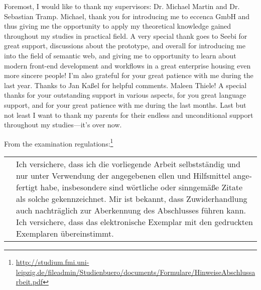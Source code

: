 Foremost, I would like to thank my supervisors: Dr. Michael Martin and Dr. Sebastian Tramp. Michael, thank you for introducing me to eccenca GmbH and thus giving me the opportunity to apply my theoretical knowledge gained throughout my studies in practical field. A very special thank goes to Seebi for great support, discussions about the prototype, and overall for introducing me into the field of semantic web, and giving me to opportunity to learn about modern front-end development and workflows in a great enterprise housing even more sincere people! I’m also grateful for your great patience with me during the last year. Thanks to Jan Kaßel for helpful comments. Maleen Thiele! A special thanks for your outstanding support in various aspects, for you great language support, and for your great patience with me during the last months. Last but not least I want to thank my parents for their endless and unconditional support throughout my studies—it’s over now.



From the examination regulations:\footnote{\url{http://studium.fmi.uni-leipzig.de/fileadmin/Studienbuero/documents/Formulare/HinweiseAbschlussarbeit.pdf}}\\[1mm]
\begin{otherlanguage}{ngerman}
\begin{tabular}{l|p{}}
\quad & Ich versichere, dass ich die vorliegende Arbeit selbstständig und nur unter Verwendung der angegebenen \Qu{}ellen und Hilfsmittel angefertigt habe, insbesondere sind wörtliche oder sinngemäße Zitate als solche gekennzeichnet. Mir ist bekannt, dass Zuwiderhandlung auch nachträglich zur Aberkennung des Abschlusses führen kann. Ich versichere, dass das elektronische Exemplar mit den gedruckten Exemplaren übereinstimmt.\footnotemark\\
\end{tabular}
\end{otherlanguage}



